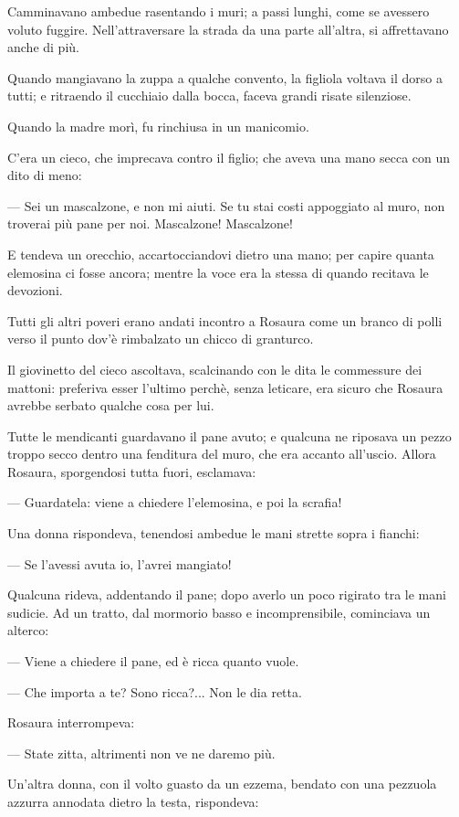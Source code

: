 Camminavano ambedue rasentando i muri; a passi lunghi, come se avessero voluto fuggire. Nell’attraversare la strada da una parte all’altra, si affrettavano anche di più.

Quando mangiavano la zuppa a qualche convento, la figliola voltava il dorso a tutti; e ritraendo il cucchiaio dalla bocca, faceva grandi risate silenziose.

Quando la madre morì, fu rinchiusa in un manicomio.

C’era un cieco, che imprecava contro il figlio; che aveva una mano secca con un dito di meno:

— Sei un mascalzone, e non mi aiuti. Se tu stai costi appoggiato al muro, non troverai più pane per noi. Mascalzone! Mascalzone!

E tendeva un orecchio, accartocciandovi dietro una mano; per capire quanta elemosina ci fosse ancora; mentre la voce era la stessa di quando recitava le devozioni.

Tutti gli altri poveri erano andati incontro a Rosaura come un branco di polli verso il punto dov’è rimbalzato un chicco di granturco.

Il giovinetto del cieco ascoltava, scalcinando con le dita le commessure dei mattoni: preferiva esser l’ultimo perchè, senza leticare, era sicuro che Rosaura avrebbe serbato qualche cosa per lui.

Tutte le mendicanti guardavano il pane avuto; e qualcuna ne riposava un pezzo troppo secco dentro una fenditura del muro, che era accanto all’uscio. Allora Rosaura, sporgendosi tutta fuori, esclamava:

— Guardatela: viene a chiedere l’elemosina, e poi la scrafia!

Una donna rispondeva, tenendosi ambedue le mani strette sopra i fianchi:

— Se l’avessi avuta io, l’avrei mangiato!

Qualcuna rideva, addentando il pane; dopo averlo un poco rigirato tra le mani sudicie. Ad un tratto, dal mormorio basso e incomprensibile, cominciava un alterco:

— Viene a chiedere il pane, ed è ricca quanto vuole.

— Che importa a te? Sono ricca?... Non le dia retta.

Rosaura interrompeva:

— State zitta, altrimenti non ve ne daremo più.

Un’altra donna, con il volto guasto da un ezzema, bendato con una pezzuola azzurra annodata dietro la testa, rispondeva:

